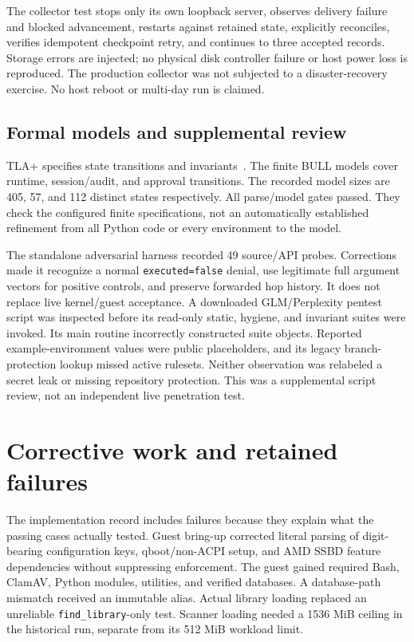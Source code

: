\documentclass[journal]{IEEEtran}
\newcommand{\code}[1]{\texttt{#1}}
\begin{document}
The collector test stops only its own loopback server, observes delivery failure and blocked advancement, restarts against retained state, explicitly reconciles, verifies idempotent checkpoint retry, and continues to three accepted records. Storage errors are injected; no physical disk controller failure or host power loss is reproduced. The production collector was not subjected to a disaster-recovery exercise. No host reboot or multi-day run is claimed.

\subsection{Formal models and supplemental review}
TLA+ specifies state transitions and invariants~\cite{E_Lamport}. The finite BULL models cover runtime, session/audit, and approval transitions. The recorded model sizes are 405, 57, and 112 distinct states respectively. All parse/model gates passed. They check the configured finite specifications, not an automatically established refinement from all Python code or every environment to the model.

The standalone adversarial harness recorded 49 source/API probes. Corrections made it recognize a normal \code{executed=false} denial, use legitimate full argument vectors for positive controls, and preserve forwarded hop history. It does not replace live kernel/guest acceptance. A downloaded GLM/Perplexity pentest script was inspected before its read-only static, hygiene, and invariant suites were invoked. Its main routine incorrectly constructed suite objects. Reported example-environment values were public placeholders, and its legacy branch-protection lookup missed active rulesets. Neither observation was relabeled a secret leak or missing repository protection. This was a supplemental script review, not an independent live penetration test.

\section{Corrective work and retained failures}
The implementation record includes failures because they explain what the passing cases actually tested. Guest bring-up corrected literal parsing of digit-bearing configuration keys, qboot/non-ACPI setup, and AMD SSBD feature dependencies without suppressing enforcement. The guest gained required Bash, ClamAV, Python modules, utilities, and verified databases. A database-path mismatch received an immutable alias. Actual library loading replaced an unreliable \code{find\_library}-only test. Scanner loading needed a 1536 MiB ceiling in the historical run, separate from its 512 MiB workload limit.
\end{document}
